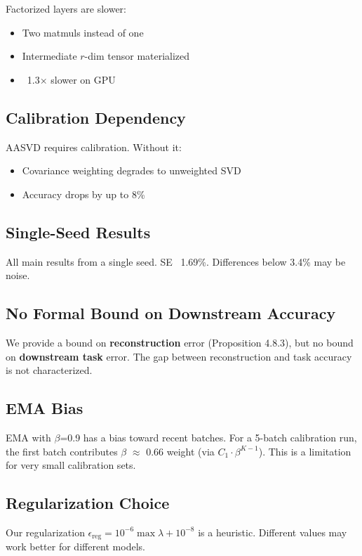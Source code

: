Factorized layers are slower:
\begin{itemize}
\item Two matmuls instead of one
\item Intermediate $r$-dim tensor materialized
\item ~1.3$\times$ slower on GPU

\end{itemize}
\subsection{Calibration Dependency}

AASVD requires calibration. Without it:
\begin{itemize}
\item Covariance weighting degrades to unweighted SVD
\item Accuracy drops by up to 8\%

\end{itemize}
\subsection{Single-Seed Results}

All main results from a single seed. SE ~1.69\%. Differences below 3.4\% 
may be noise.

\subsection{No Formal Bound on Downstream Accuracy}

We provide a bound on \textbf{reconstruction} error (Proposition 4.8.3), but 
no bound on \textbf{downstream task} error. The gap between reconstruction and 
task accuracy is not characterized.

\subsection{EMA Bias}

EMA with $\beta$=0.9 has a bias toward recent batches. For a 5-batch calibration 
run, the first batch contributes $\beta$  $\approx$ 0.66 weight (via $C_1 \cdot \beta^{K-1}$). 
This is a limitation for very small calibration sets.

\subsection{Regularization Choice}

Our regularization $\epsilon_\text{reg} = 10^{-6} \max \lambda + 10^{-8}$ is 
a heuristic. Different values may work better for different models.

